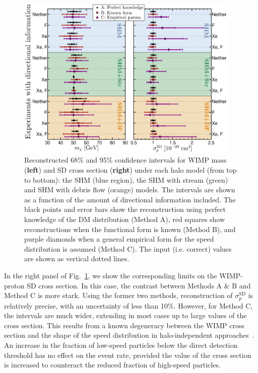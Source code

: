 \begin{figure}
\centering
\includegraphics[width=0.95\textwidth]{Figures/mx-recon.eps}
\caption[Reconstructed confidence intervals for WIMP mass and cross section]{Reconstructed 68\% and 95\% confidence intervals for WIMP mass ({\bf left}) and SD cross section ({\bf right}) under each halo model (from top to bottom): the SHM (blue region), the SHM with stream (green) and SHM with debris flow (orange) models. The intervals are shown as a function of the amount of directional information included. The black points and error bars show the reconstruction using perfect knowledge of the DM distribution (Method A), red squares show reconstructions when the functional form is known (Method B), and purple diamonds when a general empirical form for the speed distribution is assumed (Method C). The input (i.e. correct) values are shown as vertical dotted lines.}\label{fig:mx-recon}
\end{figure}
In the right panel of Fig.~\ref{fig:mx-recon}, we show the corresponding limits on the WIMP-proton SD cross section. In this case, the contrast between Methods A \& B and Method C is more stark. Using the former two methods, reconstruction of $\sigma_p^\mathrm{SD}$ is relatively precise, with an uncertainty of less than 10\%. However, for Method C, the intervals are much wider, extending in most cases up to large values of the cross section. This results from a known degeneracy between the WIMP cross section and the shape of the speed distribution in halo-independent approaches~\cite{Kavanagh:2013wba}. An increase in the fraction of low-speed particles below the direct detection threshold has no effect on the event rate, provided the value of the cross section is increased to counteract the reduced fraction of high-speed particles.

